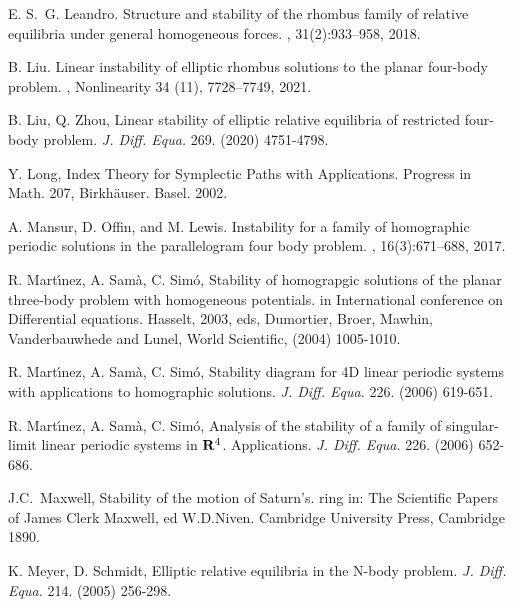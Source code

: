 \documentclass[11pt]{article}
\def\R{{\bf R}}
\begin{document}
\begin{thebibliography}{}
E. S.~G. Leandro.
\newblock Structure and stability of the rhombus family of relative equilibria
under general homogeneous forces.
, 31(2):933--958,  {2018}.



B. Liu.
\newblock Linear instability of elliptic rhombus solutions to the planar four-body problem.
, Nonlinearity 34 (11), 7728–7749, 2021.


 B. Liu, Q. Zhou, Linear stability of elliptic relative equilibria of restricted four-body problem.
{\it J. Diff. Equa.} 269. (2020) 4751-4798.

 Y. Long, Index Theory for Symplectic Paths with
	Applications. Progress in Math. 207, Birkh\"auser. Basel. 2002.


A. Mansur, D. Offin, and M. Lewis.
\newblock Instability for a family of homographic periodic solutions in the
parallelogram four body problem.
, 16(3):671--688,  {2017}.

 R. Mart\'{\i}nez, A. Sam\`{a}, C. Sim\'{o},
Stability of homograpgic solutions of the planar three-body problem
with homogeneous potentials. in International conference on
Differential equations. Hasselt, 2003, eds, Dumortier, Broer, Mawhin,
Vanderbauwhede and Lunel, World Scientific, (2004) 1005-1010.

 R. Mart\'{\i}nez, A. Sam\`{a}, C. Sim\'{o},
Stability diagram for 4D linear periodic systems with applications
to homographic solutions. {\it J. Diff. Equa.} 226. (2006) 619-651.

 R. Mart\'{\i}nez, A. Sam\`{a}, C. Sim\'{o}, Analysis of
the stability of a family of singular-limit linear periodic systems in
$\R^4$. Applications. {\it J. Diff. Equa.} 226. (2006) 652-686.

 J.C.~Maxwell,
Stability of the motion of Saturn's. ring in:
The Scientific Papers of James Clerk
Maxwell, ed W.D.Niven.
Cambridge University Press, Cambridge 1890.


 K. Meyer, D. Schmidt, Elliptic relative equilibria in
the N-body problem. {\it J. Diff. Equa.} 214. (2005) 256-298.


\end{thebibliography}
\end{document}
